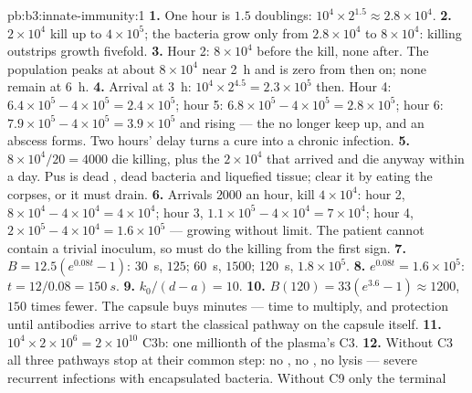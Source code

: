 \begin{solution}{pb:b3:innate-immunity:1}
\textbf{1.} One hour is $1.5$ doublings: $10^{4}\times 2^{1.5} \approx
2.8\times 10^{4}$.
\textbf{2.} $2\times 10^{4}$  kill up to $4\times 10^{5}$;
the bacteria grow only from $2.8\times 10^{4}$ to $8\times 10^{4}$:
killing outstrips growth fivefold.
\textbf{3.} Hour 2: $8\times 10^{4}$ before the kill, none after. The
population peaks at about $8\times 10^{4}$ near \qty{2}{h} and is zero
from then on; none remain at \qty{6}{h}.
\textbf{4.} Arrival at \qty{3}{h}: $10^{4}\times 2^{4.5} = 2.3\times
10^{5}$ then. Hour 4: $6.4\times 10^{5} - 4\times 10^{5} = 2.4\times
10^{5}$; hour 5: $6.8\times 10^{5} - 4\times 10^{5} = 2.8\times 10^{5}$;
hour 6: $7.9\times 10^{5} - 4\times 10^{5} = 3.9\times 10^{5}$ and
rising --- the  no longer keep up, and an abscess forms. Two
hours' delay turns a cure into a chronic infection.
\textbf{5.} $8\times 10^{4}/20 = 4000$  die killing, plus the
$2\times 10^{4}$ that arrived and die anyway within a day. Pus is dead
, dead bacteria and liquefied tissue;  clear it
by eating the corpses, or it must drain.
\textbf{6.} Arrivals $2000$ an hour, kill $4\times 10^{4}$: hour 2,
$8\times 10^{4} - 4\times 10^{4} = 4\times 10^{4}$; hour 3, $1.1\times
10^{5} - 4\times 10^{4} = 7\times 10^{4}$; hour 4, $2\times 10^{5} -
4\times 10^{4} = 1.6\times 10^{5}$ --- growing without limit. The
patient cannot contain a trivial inoculum, so  must do the
killing from the first sign.
\textbf{7.} $B = 12.5(e^{0.08t} - 1)$: \qty{30}{s}, $125$; \qty{60}{s},
$1500$; \qty{120}{s}, $1.8\times 10^{5}$.
\textbf{8.} $e^{0.08t} = 1.6\times 10^{5}$: $t = 12/0.08 = \qty{150}{s}$.
\textbf{9.} $k_{0}/(d - a) = 10$.
\textbf{10.} $B(120) = 33(e^{3.6} - 1) \approx 1200$, $150$ times fewer.
The capsule buys minutes --- time to multiply, and protection until
antibodies arrive to start the classical pathway on the capsule
itself.
\textbf{11.} $10^{4}\times 2\times 10^{6} = 2\times 10^{10}$ C3b: one
millionth of the plasma's C3.
\textbf{12.} Without C3 all three pathways stop at their common step:
no , no , no lysis --- severe recurrent
infections with encapsulated bacteria. Without C9 only the terminal

\end{solution}
